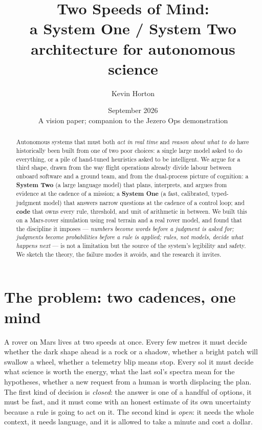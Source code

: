 \documentclass[11pt]{article}
\title{Two Speeds of Mind:\\ a System One / System Two architecture for autonomous science}
\author{Kevin Horton}
\date{September 2026 \\ \small A vision paper; companion to the Jezero Ops demonstration}
\begin{document}
\maketitle

\begin{abstract}
Autonomous systems that must both \emph{act in real time} and \emph{reason about what to do} have historically been built from one of two poor choices: a single large model asked to do everything, or a pile of hand-tuned heuristics asked to be intelligent. We argue for a third shape, drawn from the way flight operations already divide labour between onboard software and a ground team, and from the dual-process picture of cognition: a \textbf{System Two} (a large language model) that plans, interprets, and argues from evidence at the cadence of a mission; a \textbf{System One} (a fast, calibrated, typed-judgment model) that answers narrow questions at the cadence of a control loop; and \textbf{code} that owns every rule, threshold, and unit of arithmetic in between. We built this on a Mars-rover simulation using real terrain and a real rover model, and found that the discipline it imposes --- \emph{numbers become words before a judgment is asked for; judgments become probabilities before a rule is applied; rules, not models, decide what happens next} --- is not a limitation but the source of the system's legibility and safety. We sketch the theory, the failure modes it avoids, and the research it invites.
\end{abstract}

\section{The problem: two cadences, one mind}

A rover on Mars lives at two speeds at once. Every few metres it must decide whether the dark shape ahead is a rock or a shadow, whether a bright patch will swallow a wheel, whether a telemetry blip means stop. Every sol it must decide what science is worth the energy, what the last sol's spectra mean for the hypotheses, whether a new request from a human is worth displacing the plan. The first kind of decision is \emph{closed}: the answer is one of a handful of options, it must be fast, and it must come with an honest estimate of its own uncertainty because a rule is going to act on it. The second kind is \emph{open}: it needs the whole context, it needs language, and it is allowed to take a minute and cost a dollar.
\end{document}
